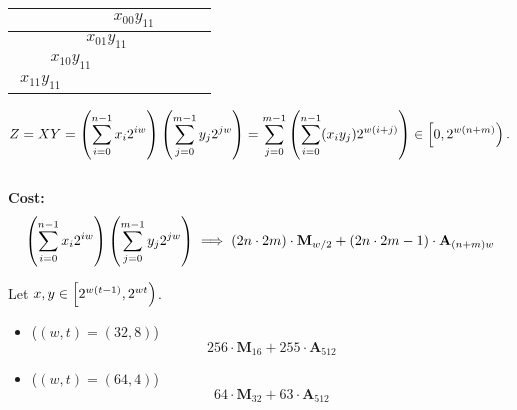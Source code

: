 \begin{center}
\begin{tabular}{|c|c|c|c|c|c|c|c|}
\hspace{15pt} & \hspace{15pt} & \hspace{15pt} & \multicolumn{2}{c|}{$x_{00}y_{11}$} & \hspace{15pt} & \hspace{15pt} & \hspace{15pt} \\ \hline
\hspace{15pt} & \hspace{15pt} & \multicolumn{2}{c|}{$x_{01}y_{11}$} & \hspace{15pt} & \hspace{15pt} & \hspace{15pt} & \hspace{15pt} \\ \hline
\hspace{15pt} & \multicolumn{2}{c|}{$x_{10}y_{11}$} & \hspace{15pt} & \hspace{15pt} & \hspace{15pt} & \hspace{15pt} & \hspace{15pt} \\ \hline
\multicolumn{2}{|c|}{$x_{11}y_{11}$} & \hspace{15pt} & \hspace{15pt} & \hspace{15pt} & \hspace{15pt} & \hspace{15pt} & \hspace{15pt} \\
\hline
\end{tabular}
\end{center}
\begin{align*}
Z=XY=\of{\sum_{i=0}^{n-1}x_i2^{iw}}\of{\sum_{j=0}^{m-1}y_j2^{jw}}=\sum_{j=0}^{m-1}\of{\sum_{i=0}^{n-1}(x_iy_j)2^{w(i+j)}}\in\intco{0,2^{w(n+m)}}.
\end{align*}
\\
\textbf{Cost:} \[
\left(\sum_{i=0}^{n-1}x_i2^{iw}\right)\left(\sum_{j=0}^{m-1}y_j2^{jw}\right)\implies\left(2n\cdot 2m\right)\cdot\textbf{M}_{w/2} + (2n\cdot 2m - 1)\cdot\textbf{A}_{(n+m)w}
\]

\begin{example}
Let $x,y\in\intco{2^{w(t-1)},2^{wt}}$.
\begin{itemize}
\item[] ($(w,t)=(32,8)$) \[
256\cdot\textbf{M}_{16} + 255\cdot\textbf{A}_{512}
\]
\item[] ($(w,t)=(64,4)$) \[
64\cdot\textbf{M}_{32} + 63\cdot\textbf{A}_{512}
\]
\end{itemize}
\end{example}

